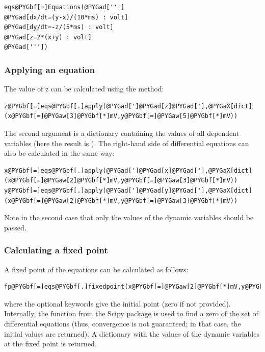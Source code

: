\documentclass[letterpaper,10pt,english]{manual}
\begin{document}
\begin{Verbatim}[commandchars=@\[\]]
eqs@PYGbf[=]Equations(@PYGad[''']
@PYGad[dx/dt=(y-x)/(10*ms) : volt]
@PYGad[dy/dt=-z/(5*ms) : volt]
@PYGad[z=2*(x+y) : volt]
@PYGad['''])
\end{Verbatim}

\hypertarget{index-17}{}\subsubsection{Applying an equation}

The value of z can be calculated using the  method:

\begin{Verbatim}[commandchars=@\[\]]
z@PYGbf[=]eqs@PYGbf[.]apply(@PYGad[']@PYGad[z]@PYGad['],@PYGaX[dict](x@PYGbf[=]@PYGaw[3]@PYGbf[*]mV,y@PYGbf[=]@PYGaw[5]@PYGbf[*]mV))
\end{Verbatim}

The second argument is a dictionary containing the values of all dependent variables
(here the result is ).
The right-hand side of differential equations can also be calculated in the same way:

\begin{Verbatim}[commandchars=@\[\]]
x@PYGbf[=]eqs@PYGbf[.]apply(@PYGad[']@PYGad[x]@PYGad['],@PYGaX[dict](x@PYGbf[=]@PYGaw[2]@PYGbf[*]mV,y@PYGbf[=]@PYGaw[3]@PYGbf[*]mV))
y@PYGbf[=]eqs@PYGbf[.]apply(@PYGad[']@PYGad[y]@PYGad['],@PYGaX[dict](x@PYGbf[=]@PYGaw[2]@PYGbf[*]mV,y@PYGbf[=]@PYGaw[3]@PYGbf[*]mV))
\end{Verbatim}

Note in the second case that only the values of the dynamic variables should be passed.

\subsubsection{Calculating a fixed point}

A fixed point of the equations can be calculated as follows:

\begin{Verbatim}[commandchars=@\[\]]
fp@PYGbf[=]eqs@PYGbf[.]fixedpoint(x@PYGbf[=]@PYGaw[2]@PYGbf[*]mV,y@PYGbf[=]@PYGaw[3]@PYGbf[*]mV)
\end{Verbatim}

where the optional keywords give the initial point (zero if not provided).
Internally, the function  from the Scipy package is used to
find a zero of the set of differential equations (thus, convergence is not
guaranteed; in that case, the initial values are returned).
A dictionary with the values of the dynamic variables at the fixed point is returned.
\end{document}
